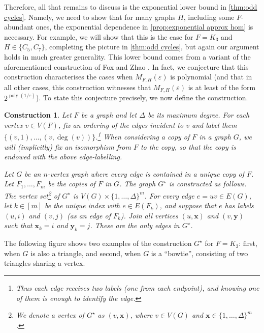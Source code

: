 \documentclass[reqno, english, 12pt]{amsart}
\theoremstyle{plain}
\newtheorem{construction}[theorem]{Construction}
\theoremstyle{remark}
\newcommand{\bx}{\mathbf{x}}
\newcommand{\by}{\mathbf{y}}
\DeclareMathOperator{\poly}{poly}
\begin{document}
Therefore, all that remains to discuss is the exponential lower bound in \cref{thm:odd cycles}. Namely, we need to show that for many graphs $H$, including some $F$-abundant ones, the exponential dependence in \cref{prop:exponential approx hom} is necessary. For example, we will show that this is the case for $F = K_3$ and $H \in \{C_5,C_7\}$, completing the picture in \cref{thm:odd cycles}, but again our argument holds in much greater generality. This lower bound comes from a variant of the aforementioned construction of Fox and Zhao \cite{FZ}. In fact, we conjecture that this construction characterises the cases when $M_{F,H}(\varepsilon)$ is polynomial (and that in all other cases, this construction witnesses that $M_{F,H}(\varepsilon)$ is at least of the form $2^{\poly(1/\varepsilon)}$). To state this conjecture precisely, we now define the construction. 
\begin{construction}
\label{con:HG}
Let $F$ be a graph and let $\Delta$ be its maximum degree. 
For each vertex $v\in V(F)$, fix an ordering of the edges incident to $v$ and label them $\{(v,1),\dots,(v,\deg(v))\}$.\footnote{Thus each edge receives two labels (one from each endpoint), and knowing one of them is enough to identify the edge.} 
When considering a copy of $F$ in a graph $G$, we will (implicitly) fix an isomorphism from $F$ to the copy, so that the copy is endowed with the above edge-labelling. 

Let $G$ be an $n$-vertex graph where every edge is contained in a unique copy of $F$.
Let $F_1,\dots,F_m$ be the copies of $F$ in $G$.
The graph $G^{\star}$ is constructed as follows. The vertex set\footnote{We denote a vertex of $G^{\star}$ as $(v,\bx)$, where $v \in V(G)$ and $\bx \in \{1,\dots,\Delta\}^m$.} of $G^{\star}$ is $V(G) \times \{1,\dots,\Delta\}^m$.
For every edge $e=uv \in E(G)$, let $k \in [m]$ be the unique index with $e \in E(F_k)$, and suppose that $e$ has labels $(u,i)$ and $(v,j)$ (as an edge of $F_k$). Join all vertices $(u,\bx)$ and $(v,\by)$ such that $\bx_k = i$ and $\by_k = j$.   
These are the only edges in $G^{\star}$. 
\end{construction}
The following figure shows two examples of the construction $G^{\star}$ for $F=K_3$: first, when $G$ is also a triangle, and second, when $G$ is a ``bowtie'', consisting of two triangles sharing a vertex.
\end{document}
